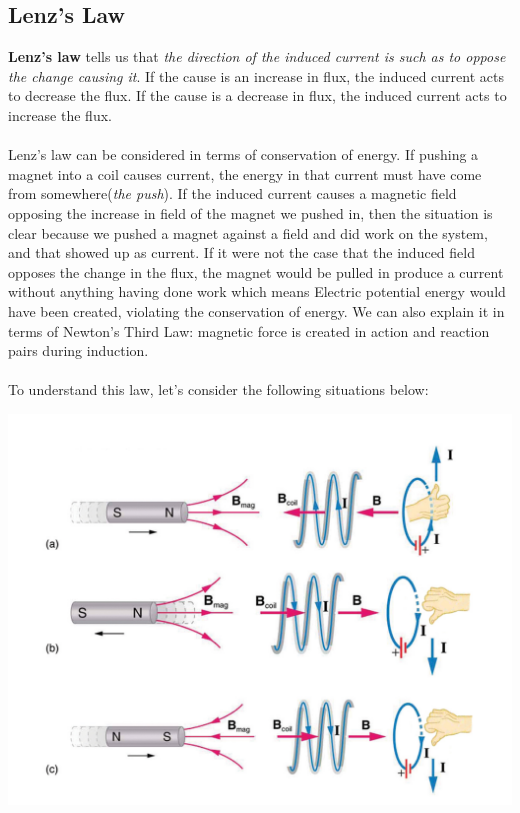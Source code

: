 \documentclass[11pt]{article}
\begin{document}
	\subsection*{Lenz's Law}
	\textbf{Lenz's law} tells us that \textit{the direction of the induced current is such as to oppose the change causing it}. If the cause is an increase in flux, the induced current acts to decrease the flux. If the cause is a decrease in flux, the induced current acts to increase the flux. \\ \\
	Lenz’s law can be considered in terms of conservation of energy. If pushing a magnet into a coil causes current, the energy in that current must have come from somewhere(\textit{the push}). If the induced current causes a magnetic field opposing the increase in field of the magnet we pushed in, then the situation is clear because we pushed a magnet against a field and did work on the system, and that showed up as current. If it were not the case that the induced field opposes the change in the flux, the magnet would be pulled in produce a current without anything having done work which means Electric potential energy would have been created, violating the conservation of energy.  We can also explain it in terms of Newton's Third Law: magnetic force is created in action and reaction pairs during induction.\\ \\
	To understand this law, let's consider the following situations below:
	\begin{center}
		\includegraphics[scale=0.25]{lenzs_law}
	\end{center}
\end{document}
